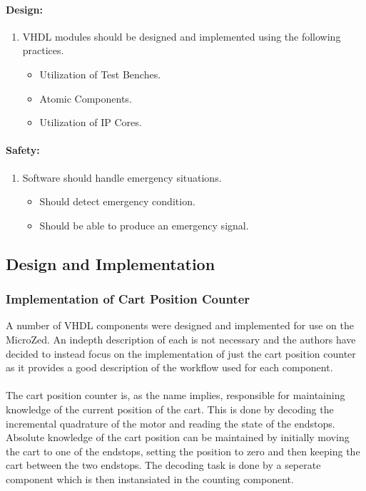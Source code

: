 \paragraph{Design:}
\begin{enumerate}[resume]
	\item VHDL modules should be designed and implemented using the following practices.
	\label{enum:vhdl_implementation_practices}
	\begin{itemize}
		\item Utilization of Test Benches.
		\item Atomic Components.
		\item Utilization of IP Cores.
	\end{itemize}
\end{enumerate}
\paragraph{Safety:}
\begin{enumerate}[resume]
	\item Software should handle emergency situations.
	\label{enum:software_should_handle_emergency}
	\begin{itemize}
		\item Should detect emergency condition.
		\item Should be able to produce an emergency signal.
	\end{itemize}
\end{enumerate}

\subsection{Design and Implementation} %
\label{sub:implementation}
\subsubsection{Implementation of Cart Position Counter} %
\label{ssub:vhdl_components}
A number of VHDL components were designed and implemented for use on the MicroZed.
An indepth description of each is not necessary and the authors have decided to instead focus on the implementation of just the cart position counter as it provides a good description of the workflow used for each component.
\\~\\
The cart position counter is, as the name implies, responsible for maintaining knowledge of the current position of the cart.
This is done by decoding the incremental quadrature of the motor and reading the state of the endstops.
Absolute knowledge of the cart position can be maintained by initially moving the cart to one of the endstops, setting the position to zero and then keeping the cart between the two endstops.
The decoding task is done by a seperate component which is then instansiated in the counting component.

